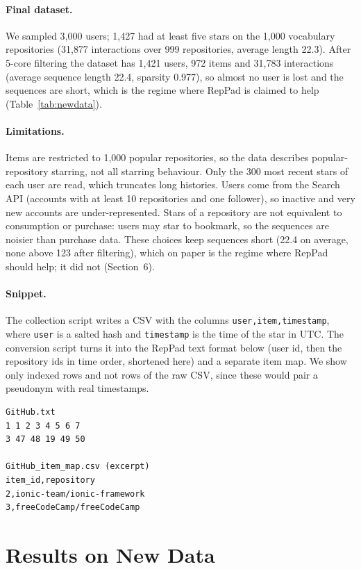 \documentclass[11pt]{article}
\begin{document}
\paragraph{Final dataset.}
We sampled 3{,}000 users; 1{,}427 had at least five stars on the 1{,}000 vocabulary
repositories (31{,}877 interactions over 999 repositories, average length 22.3).
After 5-core filtering the dataset has 1{,}421 users, 972 items and 31{,}783
interactions (average sequence length 22.4, sparsity 0.977), so almost no user is
lost and the sequences are short, which is the regime where RepPad is claimed to
help (Table~\ref{tab:newdata}).

\paragraph{Limitations.}
Items are restricted to 1{,}000 popular repositories, so the data describes
popular-repository starring, not all starring behaviour. Only the 300 most recent
stars of each user are read, which truncates long histories. Users come from the
Search API (accounts with at least 10 repositories and one follower), so inactive
and very new accounts are under-represented. Stars of a repository are not
equivalent to consumption or purchase: users may star to bookmark, so the sequences
are noisier than purchase data. These choices keep sequences short (22.4 on average, none above 123 after filtering), which on paper is the regime where RepPad should help; it did not (Section~6).

\paragraph{Snippet.}
The collection script writes a CSV with the columns \texttt{user,item,timestamp}, where \texttt{user} is a
salted hash and \texttt{timestamp} is the time of the star in UTC. The conversion script turns it into the
RepPad text format below (user id, then the repository ids in time order, shortened here) and a separate item map.
We show only indexed rows and not rows of the raw CSV, since these would pair a pseudonym with real timestamps.
{\footnotesize
\begin{verbatim}
GitHub.txt
1 1 2 3 4 5 6 7
3 47 48 19 49 50

GitHub_item_map.csv (excerpt)
item_id,repository
2,ionic-team/ionic-framework
3,freeCodeCamp/freeCodeCamp
\end{verbatim}
}


\section{Results on New Data}
\end{document}
